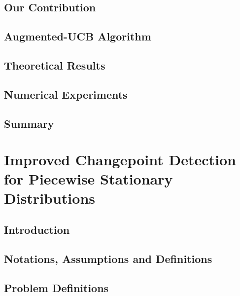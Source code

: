 \documentclass[MS]{iitmdiss}
\begin{document}
\section{Our Contribution}
\label{tbandit:contribution}



\section{Augmented-UCB Algorithm}
\label{tbandit:algorithm}



\section{Theoretical Results}
\label{tbandit:results}



\section{Numerical Experiments}
\label{tbandit:expt}



\section{Summary}
\label{tbandit:conclusion}





\chapter{Improved Changepoint Detection for Piecewise Stationary Distributions}
\label{chap:psbandit}

\section{Introduction}
\label{psbandit:intro}


\section{Notations, Assumptions and Definitions}
\label{psbandit:notations}


\section{Problem Definitions}
\label{psbandit:probDef}

\end{document}
